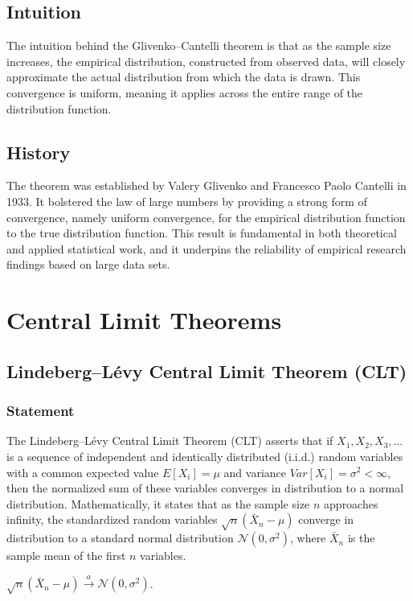 \documentclass{article}
\begin{document}
\subsection{Intuition}
The intuition behind the Glivenko–Cantelli theorem is that as the sample size increases, the empirical distribution, constructed from observed data, will closely approximate the actual distribution from which the data is drawn. This convergence is uniform, meaning it applies across the entire range of the distribution function.

\subsection{History}
The theorem was established by Valery Glivenko and Francesco Paolo Cantelli in 1933. It bolstered the law of large numbers by providing a strong form of convergence, namely uniform convergence, for the empirical distribution function to the true distribution function. This result is fundamental in both theoretical and applied statistical work, and it underpins the reliability of empirical research findings based on large data sets.


\section{Central Limit Theorems}
\subsection{Lindeberg–Lévy Central Limit Theorem (CLT)}
\subsubsection{Statement}
The Lindeberg–Lévy Central Limit Theorem (CLT) asserts that if \( X_1, X_2, X_3, \ldots \) is a sequence of independent and identically distributed (i.i.d.) random variables with a common expected value \( E[X_i] = \mu \) and variance \( Var[X_i] = \sigma^2 < \infty \), then the normalized sum of these variables converges in distribution to a normal distribution. Mathematically, it states that as the sample size \( n \) approaches infinity, the standardized random variables \( \sqrt{n}(\bar{X}_n - \mu) \) converge in distribution to a standard normal distribution \( \mathcal{N}(0, \sigma^2) \), where \( \bar{X}_n \) is the sample mean of the first \( n \) variables.

$\sqrt{n}\left(\bar{X}_n-\mu\right) \xrightarrow{a} \mathcal{N}\left(0, \sigma^2\right)$.
\end{document}
